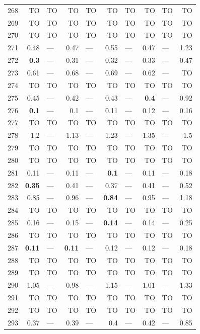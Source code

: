 \begin{longtable}{lr@{\hskip 4pt}l@{\hskip 12pt}r@{\hskip 4pt}l@{\hskip 12pt}r@{\hskip 4pt}l@{\hskip 12pt}r@{\hskip 4pt}l@{\hskip 12pt}r}
268 & TO & TO & TO & TO & TO & TO & TO & TO & TO \\
269 & TO & TO & TO & TO & TO & TO & TO & TO & TO \\
270 & TO & TO & TO & TO & TO & TO & TO & TO & TO \\
271 & 0.48 & --- & 0.47 & --- & 0.55 & --- & 0.47 & --- & 1.23 \\
272 & \textbf{0.3} & --- & 0.31 & --- & 0.32 & --- & 0.33 & --- & 0.47 \\
273 & 0.61 & --- & 0.68 & --- & 0.69 & --- & 0.62 & --- & TO \\
274 & TO & TO & TO & TO & TO & TO & TO & TO & TO \\
275 & 0.45 & --- & 0.42 & --- & 0.43 & --- & \textbf{0.4} & --- & 0.92 \\
276 & \textbf{0.1} & --- & 0.1 & --- & 0.11 & --- & 0.12 & --- & 0.16 \\
277 & TO & TO & TO & TO & TO & TO & TO & TO & TO \\
278 & 1.2 & --- & 1.13 & --- & 1.23 & --- & 1.35 & --- & 1.5 \\
279 & TO & TO & TO & TO & TO & TO & TO & TO & TO \\
280 & TO & TO & TO & TO & TO & TO & TO & TO & TO \\
281 & 0.11 & --- & 0.11 & --- & \textbf{0.1} & --- & 0.11 & --- & 0.18 \\
282 & \textbf{0.35} & --- & 0.41 & --- & 0.37 & --- & 0.41 & --- & 0.52 \\
283 & 0.85 & --- & 0.96 & --- & \textbf{0.84} & --- & 0.95 & --- & 1.18 \\
284 & TO & TO & TO & TO & TO & TO & TO & TO & TO \\
285 & 0.16 & --- & 0.15 & --- & \textbf{0.14} & --- & 0.14 & --- & 0.25 \\
286 & TO & TO & TO & TO & TO & TO & TO & TO & TO \\
287 & \textbf{0.11} & --- & \textbf{0.11} & --- & 0.12 & --- & 0.12 & --- & 0.18 \\
288 & TO & TO & TO & TO & TO & TO & TO & TO & TO \\
289 & TO & TO & TO & TO & TO & TO & TO & TO & TO \\
290 & 1.05 & --- & 0.98 & --- & 1.15 & --- & 1.01 & --- & 1.33 \\
291 & TO & TO & TO & TO & TO & TO & TO & TO & TO \\
292 & TO & TO & TO & TO & TO & TO & TO & TO & TO \\
293 & 0.37 & --- & 0.39 & --- & 0.4 & --- & 0.42 & --- & 0.85 \\

\end{longtable}
